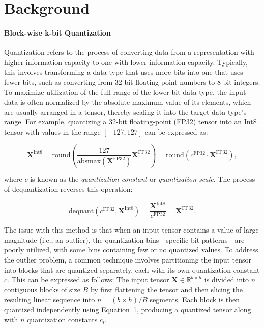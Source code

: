 \section{Background}
\paragraph{Block-wise k-bit Quantization} Quantization refers to the process of converting data from a representation with higher information capacity to one with lower information capacity. Typically, this involves transforming a data type that uses more bits into one that uses fewer bits, such as converting from 32-bit floating-point numbers to 8-bit integers. To maximize utilization of the full range of the lower-bit data type, the input data is often normalized by the absolute maximum value of its elements, which are usually arranged in a tensor, thereby scaling it into the target data type's range. For example, quantizing a 32-bit floating-point (FP32) tensor into an Int8 tensor with values in the range $[-127, 127]$ can be expressed as:

\begin{equation}
    \mathbf{X}^{ \text{Int8}} = \text{round}\left( \frac{127}{{\text{absmax}}(\mathbf{X}^{{\text{FP32}}})}\mathbf{X}^{{\text{FP32}}} \right) = \text{round}(c^{\text{FP32}}\cdot \mathbf{X}^{{\text{FP32}}}),
\end{equation}

where $c$ is known as the {\em quantization constant} or {\em quantization scale}. The process of dequantization reverses this operation:

\begin{equation}
    \text{dequant}(c^{\text{FP32}}, \mathbf{X}^{\text{Int8}}) = \frac{\mathbf{X}^{\text{Int8}}}{c^{\text{FP32}}} = \mathbf{X}^{\text{FP32}}.
\end{equation}

The issue with this method is that when an input tensor contains a value of large magnitude (i.e., an outlier), the quantization bins—specific bit patterns—are poorly utilized, with some bins containing few or no quantized values. To address the outlier problem, a common technique involves partitioning the input tensor into blocks that are quantized separately, each with its own quantization constant $c$. This can be expressed as follows: The input tensor $\mathbf{X}\in \mathbb{R}^{b\times h}$ is divided into $n$ contiguous blocks of size $B$ by first flattening the tensor and then slicing the resulting linear sequence into ${n = ({b\times h} )/{B} }$ segments. Each block is then quantized independently using Equation~1, producing a quantized tensor along with $n$ quantization constants $c_i$.

